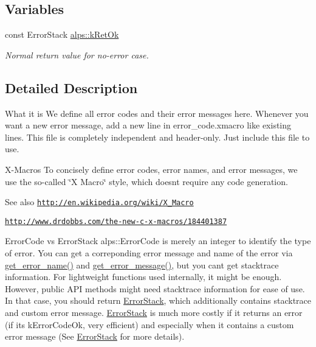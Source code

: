 \subsection*{Variables}
\begin{DoxyCompactItemize}
\item 
const Error\+Stack \hyperlink{group__ERRORCODES_ga61cb36ecdcc8115b0d7bca4a0877222b}{alps\+::k\+Ret\+Ok}
\begin{DoxyCompactList}\small\item\em Normal return value for no-\/error case. \end{DoxyCompactList}\end{DoxyCompactItemize}


\subsection{Detailed Description}
\begin{DoxyParagraph}{What it is}
We define all error codes and their error messages here. Whenever you want a new error message, add a new line in error\+\_\+code.\+xmacro like existing lines. This file is completely independent and header-\/only. Just include this file to use.
\end{DoxyParagraph}
\begin{DoxyParagraph}{X-\/\+Macros}
To concisely define error codes, error names, and error messages, we use the so-\/called \char`\"{}\+X Macro\char`\"{} style, which doesn\textquotesingle{}t require any code generation. 
\end{DoxyParagraph}
\begin{DoxySeeAlso}{See also}
\href{http://en.wikipedia.org/wiki/X_Macro}{\tt http\+://en.\+wikipedia.\+org/wiki/\+X\+\_\+\+Macro} 

\href{http://www.drdobbs.com/the-new-c-x-macros/184401387}{\tt http\+://www.\+drdobbs.\+com/the-\/new-\/c-\/x-\/macros/184401387}
\end{DoxySeeAlso}
\begin{DoxyParagraph}{Error\+Code vs Error\+Stack}
alps\+::\+Error\+Code is merely an integer to identify the type of error. You can get a correponding error message and name of the error via \hyperlink{group__ERRORCODES_ga1f9f68d3e1a7d17985e648ee002ff930}{get\+\_\+error\+\_\+name()} and \hyperlink{group__ERRORCODES_gac002d42f81c3c276057ce14abe44425d}{get\+\_\+error\+\_\+message()}, but you can\textquotesingle{}t get stacktrace information. For lightweight functions used internally, it might be enough. However, public A\+PI methods might need stacktrace information for ease of use. In that case, you should return \hyperlink{classalps_1_1ErrorStack}{Error\+Stack}, which additionally contains stacktrace and custom error message. \hyperlink{classalps_1_1ErrorStack}{Error\+Stack} is much more costly if it returns an error (if it\textquotesingle{}s k\+Error\+Code\+Ok, very efficient) and especially when it contains a custom error message (See \hyperlink{classalps_1_1ErrorStack}{Error\+Stack} for more details).
\end{DoxyParagraph}
